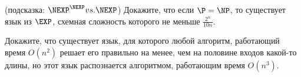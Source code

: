 \begin{ptask}{26}(подсказка: $\NEXP^{\NEXP} vs. \NEXP$)
    Докажите, что если $\P = \NP$, то существует язык из $\EXP$, схемная сложность которого не меньше $\frac{2^n}{10 n}$.
\end{ptask}

\begin{ptask}{27}
	Докажите, что существует язык, для которого любой алгоритм, работающий время $O(n^2)$ решает его правильно на менее, чем на
    половине входов какой-то длины, но этот язык распознается алгоритмом, работающим время $O(n^3)$.
\end{ptask}